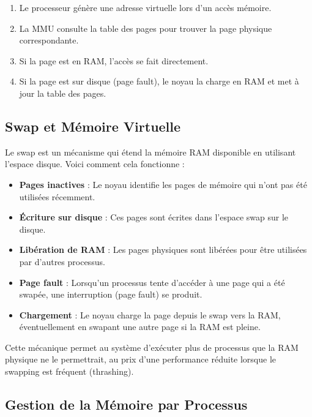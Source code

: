 \documentclass[12pt,a4paper]{article}
\begin{document}
\begin{enumerate}
    \item Le processeur génère une adresse virtuelle lors d'un accès mémoire.
    \item La MMU consulte la table des pages pour trouver la page physique correspondante.
    \item Si la page est en RAM, l'accès se fait directement.
    \item Si la page est sur disque (page fault), le noyau la charge en RAM et met à jour la table des pages.
\end{enumerate}

\subsection{Swap et Mémoire Virtuelle}

Le swap est un mécanisme qui étend la mémoire RAM disponible en utilisant l'espace disque. Voici comment cela fonctionne :

\begin{itemize}
    \item \textbf{Pages inactives} : Le noyau identifie les pages de mémoire qui n'ont pas été utilisées récemment.
    
    \item \textbf{Écriture sur disque} : Ces pages sont écrites dans l'espace swap sur le disque.
    
    \item \textbf{Libération de RAM} : Les pages physiques sont libérées pour être utilisées par d'autres processus.
    
    \item \textbf{Page fault} : Lorsqu'un processus tente d'accéder à une page qui a été swapée, une interruption (page fault) se produit.
    
    \item \textbf{Chargement} : Le noyau charge la page depuis le swap vers la RAM, éventuellement en swapant une autre page si la RAM est pleine.
\end{itemize}

Cette mécanique permet au système d'exécuter plus de processus que la RAM physique ne le permettrait, au prix d'une performance réduite lorsque le swapping est fréquent (thrashing).

\subsection{Gestion de la Mémoire par Processus}
\end{document}
